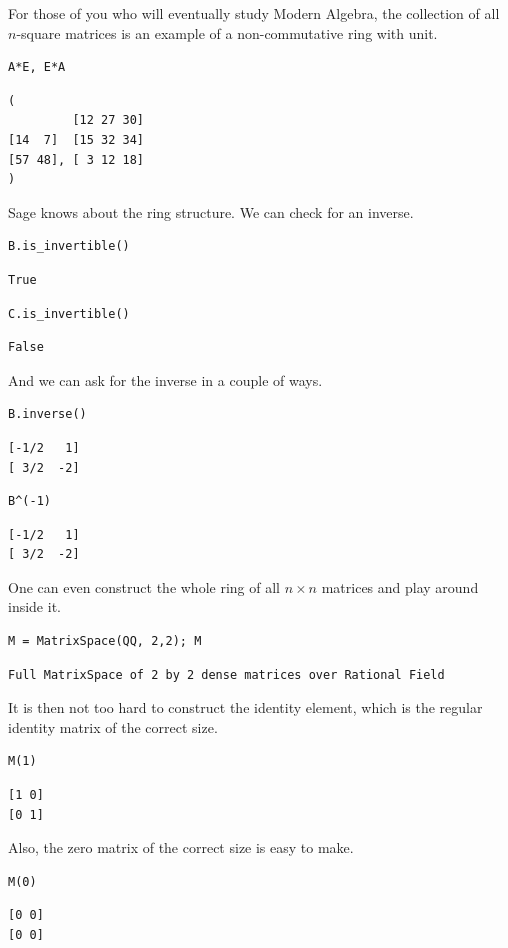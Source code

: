 \documentclass[10pt,]{book}
\theoremstyle{plain}
\theoremstyle{definition}
\numberwithin{equation}{section}
\begin{document}
        For those of you who will eventually study Modern Algebra, the collection
        of all \(n\)-square matrices is an example of a non-commutative ring
        with unit.
\begin{lstlisting}[style=sageinput]
A*E, E*A
\end{lstlisting}
\begin{lstlisting}[style=sageoutput]
(
         [12 27 30]
[14  7]  [15 32 34]
[57 48], [ 3 12 18]
)
\end{lstlisting}
\par
Sage knows about the ring structure. We can check for an inverse.%
\begin{lstlisting}[style=sageinput]
B.is_invertible()
\end{lstlisting}
\begin{lstlisting}[style=sageoutput]
True
\end{lstlisting}
\begin{lstlisting}[style=sageinput]
C.is_invertible()
\end{lstlisting}
\begin{lstlisting}[style=sageoutput]
False
\end{lstlisting}
\par
And we can ask for the inverse in a couple of ways.%
\begin{lstlisting}[style=sageinput]
B.inverse()
\end{lstlisting}
\begin{lstlisting}[style=sageoutput]
[-1/2   1]
[ 3/2  -2]
\end{lstlisting}
\begin{lstlisting}[style=sageinput]
B^(-1)
\end{lstlisting}
\begin{lstlisting}[style=sageoutput]
[-1/2   1]
[ 3/2  -2]
\end{lstlisting}
\par
One can even construct the whole ring of all \(n\times n\) matrices
      and play around inside it.%
\begin{lstlisting}[style=sageinput]
M = MatrixSpace(QQ, 2,2); M
\end{lstlisting}
\begin{lstlisting}[style=sageoutput]
Full MatrixSpace of 2 by 2 dense matrices over Rational Field
\end{lstlisting}
\par
It is then not too hard to construct the identity element, which is
        the regular identity matrix of the correct size.
\begin{lstlisting}[style=sageinput]
M(1)
\end{lstlisting}
\begin{lstlisting}[style=sageoutput]
[1 0]
[0 1]
\end{lstlisting}
\par
Also, the zero matrix of the correct size is easy to make.%
\begin{lstlisting}[style=sageinput]
M(0)
\end{lstlisting}
\begin{lstlisting}[style=sageoutput]
[0 0]
[0 0]
\end{lstlisting}
\par
\end{document}
